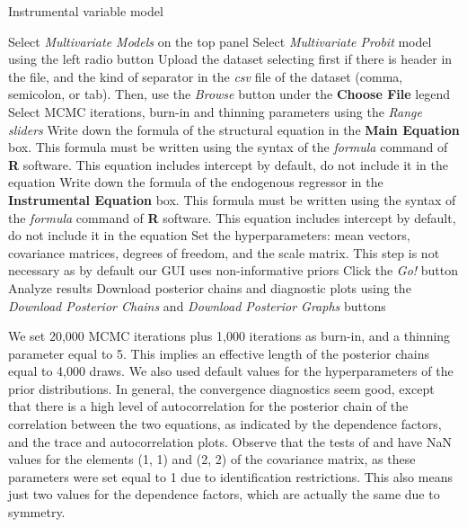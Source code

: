 \begin{algorithm}[h!]
	\caption{Instrumental variable model}\label{alg:MtultProbit}
	\begin{algorithmic}[1]  		 			
		\State Select \textit{Multivariate Models} on the top panel
		\State Select \textit{Multivariate Probit} model using the left radio button
		\State Upload the dataset selecting first if there is header in the file, and the kind of separator in the \textit{csv} file of the dataset (comma, semicolon, or tab). Then, use the \textit{Browse} button under the \textbf{Choose File} legend
		\State Select MCMC iterations, burn-in and thinning parameters using the \textit{Range sliders}
		\State Write down the formula of the structural equation in the \textbf{Main Equation} box. This formula must be written using the syntax of the \textit{formula} command of \textbf{R} software. This equation includes intercept by default, do not include it in the equation
		\State Write down the formula of the endogenous regressor in the \textbf{Instrumental Equation} box. This formula must be written using the syntax of the \textit{formula} command of \textbf{R} software. This equation includes intercept by default, do not include it in the equation
		\State Set the hyperparameters: mean vectors, covariance matrices, degrees of freedom, and the scale matrix. This step is not necessary as by default our GUI uses non-informative priors
		\State Click the \textit{Go!} button
		\State Analyze results
		\State Download posterior chains and diagnostic plots using the \textit{Download Posterior Chains} and \textit{Download Posterior Graphs} buttons
	\end{algorithmic} 
\end{algorithm}


We set 20,000 MCMC iterations plus 1,000 iterations as burn-in, and a thinning parameter equal to 5.
This implies an effective length of the posterior chains equal to 4,000 draws.
We also used default values for the hyperparameters of the prior distributions.
In general, the convergence diagnostics seem good, except that there is a high level of autocorrelation for the posterior chain of the correlation between the two equations, as indicated by the dependence factors, and the trace and autocorrelation plots.
Observe that the tests of \cite{Geweke1992} and \cite{Heidelberger1983} have NaN values for the elements (1, 1) and (2, 2) of the covariance matrix, as these parameters were set equal to 1 due to identification restrictions.
This also means just two values for the dependence factors, which are actually the same due to symmetry.

